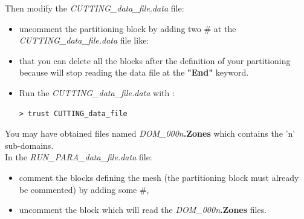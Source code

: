 Then modify the \textit{CUTTING\_data\_file.data} file:
\begin{itemize}
\item uncomment the partitioning block by adding two \# at the \textit{CUTTING\_data\_file.data} file like:
\begin{center}
\end{center}

\item \Note that you can delete all the blocks after the definition of your partitioning because \trust will stop reading the data file at the \textbf{"End"} keyword.

\item Run the \textit{CUTTING\_data\_file.data} with \trust:
\begin{verbatim}
> trust CUTTING_data_file
\end{verbatim}
\end{itemize}
You may have obtained files named \textit{DOM\_000n}\textbf{.Zones} which contains the 'n' sub-domains.\\

In the \textit{RUN\_PARA\_data\_file.data} file:
\begin{itemize}
\item comment the blocks defining the mesh (the partitioning block must already be commented) by adding some \#, 
\item uncomment the block which will read the \textit{DOM\_000n}\textbf{.Zones} files.
\end{itemize}

